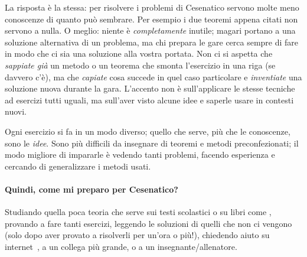 \documentclass[a4paper,10pt]{paper}
\begin{document}
 La risposta è la stessa: per risolvere i problemi di Cesenatico servono molte meno conoscenze di quanto può sembrare. Per esempio i due teoremi appena citati non servono a nulla. O meglio: niente è \emph{completamente} inutile; magari portano a una soluzione alternativa di un problema, ma chi prepara le gare cerca sempre di fare in modo che ci sia una soluzione alla vostra portata. Non ci si aspetta che \emph{sappiate già} un metodo o un teorema che smonta l'esercizio in una riga (se davvero c'è), ma che \emph{capiate} cosa succede in quel caso particolare e \emph{inventiate} una soluzione nuova durante la gara. L'accento non è sull'applicare le stesse tecniche ad esercizi tutti uguali, ma sull'aver visto alcune idee e saperle usare in contesti nuovi.
 
 Ogni esercizio si fa in un modo diverso; quello che serve, più che le conoscenze, sono le \emph{idee}. Sono più difficili da insegnare di teoremi e metodi preconfezionati; il modo migliore di impararle è vedendo tanti problemi, facendo esperienza e cercando di generalizzare i metodi usati. 

\paragraph{Quindi, come mi preparo per Cesenatico?}
Studiando quella poca teoria che serve sui testi scolastici o su libri come \cite{culipiccoli,dispenseudine,paolini}, provando a fare tanti esercizi, leggendo le soluzioni di quelli che non ci vengono (solo dopo aver provato a risolverli per un'ora o più!), chiedendo aiuto su internet~\cite{oliforum}, a un collega più grande, o a un insegnante/allenatore.
 
\end{document}
